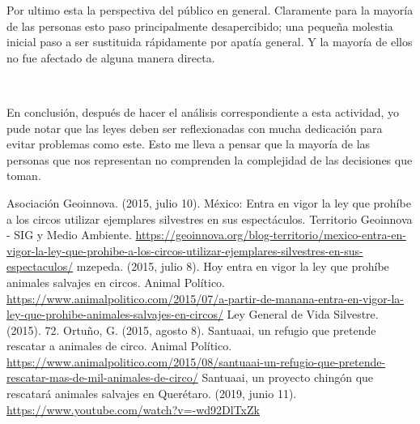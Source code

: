 \documentclass[12pt]{article}
\begin{document}
 \par Por ultimo esta la perspectiva del público en general. Claramente para la mayoría de las personas esto paso principalmente desapercibido; una pequeña molestia inicial paso a ser sustituida rápidamente por apatía general. Y la mayoría de ellos no fue afectado de alguna manera directa.
 
 \par \
 \par En conclusión, después de hacer el análisis correspondiente a esta actividad, yo pude notar que las leyes deben ser reflexionadas con mucha dedicación para evitar problemas como este. Esto me lleva a pensar que la mayoría de las personas que nos representan no comprenden la complejidad de las decisiones que toman.

 


\newpage
\begin{thebibliography}{X}
	 Asociación Geoinnova. (2015, julio 10). México: Entra en vigor la ley que prohíbe a los circos utilizar ejemplares silvestres en sus espectáculos. Territorio Geoinnova - SIG y Medio Ambiente. \url{https://geoinnova.org/blog-territorio/mexico-entra-en-vigor-la-ley-que-prohibe-a-los-circos-utilizar-ejemplares-silvestres-en-sus-espectaculos/}
	\bibitem[mzepeda, 2015]{animalpolitico} mzepeda. (2015, julio 8). Hoy entra en vigor la ley que prohíbe animales salvajes en circos. Animal Político. \url{https://www.animalpolitico.com/2015/07/a-partir-de-manana-entra-en-vigor-la-ley-que-prohibe-animales-salvajes-en-circos/}
	\bibitem[LGVS, 2015]{ley} Ley General de Vida Silvestre. (2015). 72.
	\bibitem[Ortuño, 2015]{santuario} Ortuño, G. (2015, agosto 8). Santuaai, un refugio que pretende rescatar a animales de circo. Animal Político. \url{https://www.animalpolitico.com/2015/08/santuaai-un-refugio-que-pretende-rescatar-mas-de-mil-animales-de-circo/}
	\bibitem[QC, 2019]{santuai} Santuaai, un proyecto chingón que rescatará animales salvajes en Querétaro. (2019, junio 11). \url{https://www.youtube.com/watch?v=-wd92DlTxZk}





\end{thebibliography}
\end{document}
